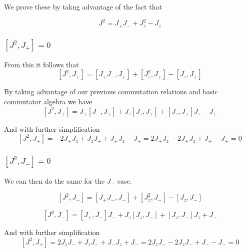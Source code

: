 \documentclass[11pt]{article} %
\begin{document}
We prove these by takng advantage of the fact that

\begin{equation}
J^2=J_+J_-+J_z^2-J_z
\end{equation}
\subsubsection{$\left[J^2,J_+\right]=0$}
From this it follows that\\
\begin{equation}
\left[J^2,J_+\right]=\left[J_+J_-,J_+\right]+\left[J_z^2,J_+\right]-\left[J_z,J_+\right]
\end{equation}

By taking advantage of our previous commutation relations and basic commutator algebra we have\\

\begin{equation}
\left[J^2,J_+\right]=J_+\left[J_-,J_+\right]+J_z\left[J_z,J_+\right]+\left[J_z,J_+\right]J_z-J_+\end{equation}


And with further simplification\\

\begin{equation}
\left[J^2,J_+\right]=-2J_+J_z+J_zJ_+ + J_+ J_z-J_+=2J_+J_z-2J_+J_z+J_+-J_+=0\end{equation}

\subsubsection{$\left[J^2,J_-\right]=0$}
We can then do the same for the $J_-$ case.

\begin{equation}
\left[J^2,J_-\right]=\left[J_+J_-,J_-\right]+\left[J_z^2,J_-\right]-\left[J_z,J_-\right]
\end{equation}


\begin{equation}
\left[J^2,J_-\right]=\left[J_+,J_-\right]J_-+J_z\left[J_z,J_-\right]+\left[J_z,J_-\right]J_z+J_-\end{equation}


And with further simplification\\

\begin{equation}
\left[J^2,J_+\right]=2J_zJ_-+J_zJ_- + J_- J_z+J_-=2J_zJ_- -2J_zJ_-+J_--J_-=0\end{equation}
\end{document}

